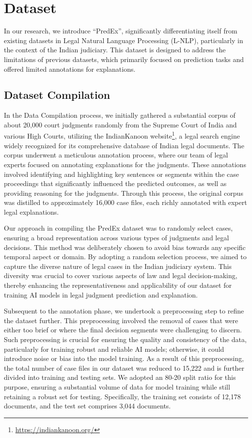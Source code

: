\section{Dataset}
In our research, we introduce ``PredEx'', significantly differentiating itself from existing datasets in Legal Natural Language Processing (L-NLP), particularly in the context of the Indian judiciary. This dataset is designed to address the limitations of previous datasets, which primarily focused on prediction tasks and offered limited annotations for explanations.

\subsection{Dataset Compilation} In the Data Compilation process, we initially gathered a substantial corpus of about 20,000 court judgments randomly from the Supreme Court of India and various High Courts, utilizing the IndianKanoon website\footnote{\url{https://indiankanoon.org/}}, a legal search engine widely recognized for its comprehensive database of Indian legal documents. The corpus underwent a meticulous annotation process, where our team of legal experts focused on annotating explanations for the judgments. These annotations involved identifying and highlighting key sentences or segments within the case proceedings that significantly influenced the predicted outcomes, as well as providing reasoning for the judgments. Through this process, the original corpus was distilled to approximately 16,000 case files, each richly annotated with expert legal explanations.

Our approach in compiling the PredEx dataset was to randomly select cases, ensuring a broad representation across various types of judgments and legal decisions. This method was deliberately chosen to avoid bias towards any specific temporal aspect or domain. By adopting a random selection process, we aimed to capture the diverse nature of legal cases in the Indian judiciary system. This diversity was crucial to cover various aspects of law and legal decision-making, thereby enhancing the representativeness and applicability of our dataset for training AI models in legal judgment prediction and explanation.

Subsequent to the annotation phase, we undertook a preprocessing step to refine the dataset further. This preprocessing involved the removal of cases that were either too brief or where the final decision segments were challenging to discern. Such preprocessing is crucial for ensuring the quality and consistency of the data, particularly for training robust and reliable AI models; otherwise, it could introduce noise or bias into the model training. As a result of this preprocessing, the total number of case files in our dataset was reduced to 15,222 and is further divided into training and testing sets. We adopted an 80-20 split ratio for this purpose, ensuring a substantial volume of data for model training while still retaining a robust set for testing. Specifically, the training set consists of 12,178 documents, and the test set comprises 3,044 documents. 

